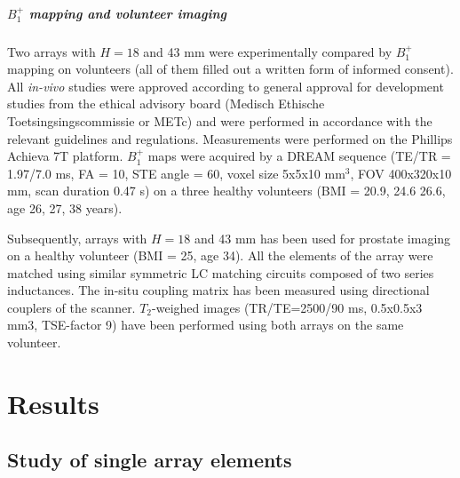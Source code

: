 \documentclass[fleqn,10pt]{wlscirep}
\begin{document}
\subparagraph*{$B_1^{+}$ mapping and volunteer imaging}

Two arrays with $H=18$ and 43 mm were experimentally compared by $B_1^{+}$ mapping on volunteers (all of them filled out a written form of informed consent). All \textit{in-vivo} studies were approved according to general approval for development studies from the ethical advisory board (Medisch Ethische Toetsingsingscommissie or METc) and were performed in accordance with the relevant guidelines and regulations. Measurements were performed on the Phillips Achieva 7T platform. $B_1^{+}$ maps were acquired by a DREAM sequence \cite{MRM:MRM24158} (TE/TR = 1.97/7.0 ms, FA = 10, STE angle = 60, voxel size 5x5x10 mm$^3$, FOV 400x320x10 mm, scan duration 0.47 s) on a three healthy volunteers (BMI = 20.9, 24.6 26.6, age 26, 27, 38 years).

Subsequently, arrays with $H=18$ and 43 mm has been used for prostate imaging on a healthy volunteer (BMI = 25, age 34). All the elements of the array were matched using similar symmetric LC matching circuits composed of two series inductances. The in-situ coupling matrix has been measured using directional couplers of the scanner. $T_{2}$-weighed images (TR/TE=2500/90 ms, 0.5x0.5x3 mm3, TSE-factor 9) have been performed using both arrays on the same volunteer.

\section*{Results}

\subsection*{Study of single array elements}
\end{document}
